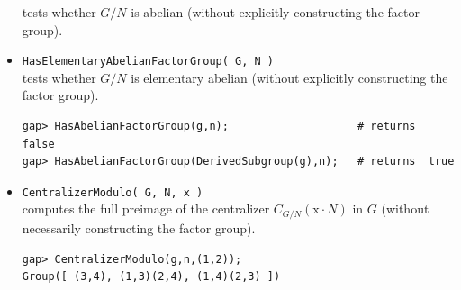 \documentclass[11pt]{amsart}
\theoremstyle{plain}
\newcommand{\codesize}{\footnotesize}
\newcommand{\<}{\ensuremath{\langle}}
\renewcommand{\>}{\ensuremath{\rangle}}
\begin{document}
\begin{itemize}
tests whether $G/N$ is abelian (without explicitly constructing the factor group).
\item {\tt HasElementaryAbelianFactorGroup( G, N )}\\[2pt] 
tests whether $G/N$ is elementary abelian (without explicitly constructing the factor group).
{\codesize
\begin{verbatim}
gap> HasAbelianFactorGroup(g,n);                    # returns  false
gap> HasAbelianFactorGroup(DerivedSubgroup(g),n);   # returns  true
\end{verbatim}}
\item {\tt CentralizerModulo( G, N, x )}\\[2pt] 
computes the full preimage of the centralizer $C_{G/N} (\mathrm{x} \cdot N)$ in $G$ 
(without necessarily constructing the factor group).
{\codesize
\begin{verbatim}
gap> CentralizerModulo(g,n,(1,2));
Group([ (3,4), (1,3)(2,4), (1,4)(2,3) ])
\end{verbatim}}
\end{itemize}

\newpage
\end{document}
